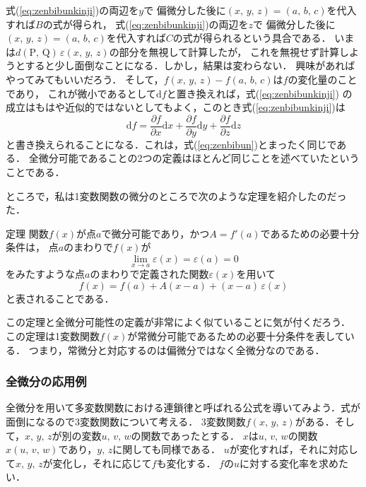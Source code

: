 式(\ref{eq:zenbibunkinji})の両辺を$y$で
偏微分した後に$(x, \, y, \, z)=(a, \, b, \, c)$を代入すれば$B$の式が得られ，
式(\ref{eq:zenbibunkinji})の両辺を$z$で
偏微分した後に$(x, \, y, \, z)=(a, \, b, \, c)$を代入すれば$C$の式が得られるという具合である．
いまは$d(\mathrm{P}, \, \mathrm{Q}) \, \varepsilon(x, \, y, \, z)$の部分を無視して計算したが，
これを無視せず計算しようとすると少し面倒なことになる．しかし，結果は変わらない．
興味があればやってみてもいいだろう．
そして，$f(x, \, y, \, z)-f(a, \, b, \, c)$は$f$の変化量のことであり，
これが微小であるとして$\mathrm{d}f$と置き換えれば，式(\ref{eq:zenbibunkinji})
の成立はもはや近似的ではないとしてもよく，このとき式(\ref{eq:zenbibunkinji})は
$$
\mathrm{d}f =
\frac{\partial f}{\partial x} \mathrm{d}x + \frac{\partial f}{\partial y} \mathrm{d}y +  \frac{\partial f}{\partial z}\mathrm{d}z
$$
と書き換えられることになる．これは，式(\ref{eq:zenbibun})とまったく同じである．
全微分可能であることの2つの定義はほとんど同じことを述べていたということである．

ところで，私は1変数関数の微分のところで次のような定理を紹介したのだった．
\begin{itembox}[l]{定理}
関数$f(x)$が点$a$で微分可能であり，かつ$A = f'(a)$であるための必要十分条件は，
点$a$のまわりで$f(x)$が
$$
\lim_{x \to a} \varepsilon (x) = \varepsilon (a) = 0
$$
をみたすような点$a$のまわりで定義された関数$\varepsilon (x)$を用いて
$$
f(x) = f(a) + A (x-a) + (x-a) \, \varepsilon (x)
$$
と表されることである．
\end{itembox}
この定理と全微分可能性の定義が非常によく似ていることに気が付くだろう．
この定理は1変数関数$f(x)$が常微分可能であるための必要十分条件を表している．
つまり，常微分と対応するのは偏微分ではなく全微分なのである．

\subsubsection{全微分の応用例}
全微分を用いて多変数関数における連鎖律と呼ばれる公式を導いてみよう．式が面倒になるので3変数関数について考える．
3変数関数$f(x, \, y, \, z)$がある．そして，$x, \, y, \, z$が別の変数$u, \, v, \, w$の関数であったとする．
$x$は$u, \, v, \, w$の関数$x(u, \, v, \, w)$であり，$y, \, z$に関しても同様である．
$u$が変化すれば，それに対応して$x, \, y, \, z$が変化し，それに応じて$f$も変化する．
$f$の$u$に対する変化率を求めたい．

